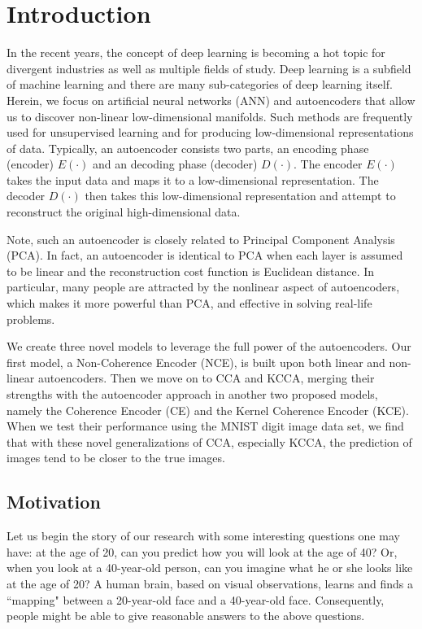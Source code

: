 \documentclass[12pt]{report} %
\begin{document}
\chapter{Introduction}
In the recent years, the concept of deep learning\cite{DL} is becoming a hot topic for divergent industries as well as multiple fields of study\cite{AUKM,TF,PR,DLRG}. Deep learning is a subfield of machine learning and there are many sub-categories of deep learning itself. Herein, we focus on artificial neural networks (ANN)\cite{NN,NN2} and autoencoders\cite{AE,AE2,AE3} that allow us to discover non-linear low-dimensional manifolds. Such methods are frequently used for unsupervised learning and for producing low-dimensional representations of data. Typically, an autoencoder consists two parts, an encoding phase (encoder) \(E(\cdot)\) and an decoding phase (decoder) \(D(\cdot)\). The encoder \(E(\cdot)\) takes the input data and maps it to a low-dimensional representation. The decoder \(D(\cdot)\) then takes this low-dimensional representation and attempt to reconstruct the original high-dimensional data.

Note, such an autoencoder is closely related to Principal Component Analysis (PCA)\cite{PCA,PCA2,STAT,KPCA}. In fact, an autoencoder is identical to PCA when each layer is assumed to be linear and the reconstruction cost function is Euclidean distance. In particular, many people are attracted by the nonlinear aspect of autoencoders, which makes it more powerful than PCA, and effective in solving real-life problems.

We create three novel models to leverage the full power of the autoencoders. Our first model, a Non-Coherence Encoder (NCE), is built upon both linear and non-linear autoencoders. Then we move on to CCA\cite{CCA,ECCA} and KCCA\cite{KCCA}, merging their strengths with the autoencoder approach in another two proposed models, namely the Coherence Encoder (CE) and the Kernel Coherence Encoder (KCE). When we test their performance using the MNIST\cite{MNIST} digit image data set, we find that with these novel generalizations of CCA, especially KCCA, the prediction of images tend to be closer to the true images. 

\section{Motivation}
Let us begin the story of our research with some interesting questions one may have: at the age of 20, can you predict how you will look at the age of 40? Or, when you look at a 40-year-old person, can you imagine what he or she looks like at the age of 20? A human brain, based on visual observations, learns and finds a ``mapping" between a 20-year-old face and a 40-year-old face. Consequently, people might be able to give reasonable answers to the above questions.
\end{document}
